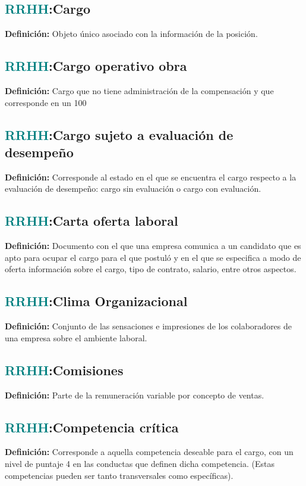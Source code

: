 \documentclass[12pt]{article}
\begin{document}
\subsection{\textcolor{teal}{RRHH}:{Cargo}}
\textbf{Definición:} Objeto único asociado con la información de la posición.
\subsection{\textcolor{teal}{RRHH}:{Cargo operativo obra}}
\textbf{Definición:} Cargo que no tiene administración de la compensación y que corresponde en un 100%
\subsection{\textcolor{teal}{RRHH}:{Cargo sujeto a evaluación de desempeño}}
\textbf{Definición:} Corresponde al estado en el que se encuentra el cargo respecto a la evaluación de desempeño: cargo sin evaluación o cargo con evaluación.
\subsection{\textcolor{teal}{RRHH}:{Carta oferta laboral}}
\textbf{Definición:} Documento con el que una empresa comunica a un candidato que es apto para ocupar el cargo para el que postuló y en el que se especifica a modo de oferta información sobre el cargo, tipo de contrato, salario, entre otros aspectos.
\subsection{\textcolor{teal}{RRHH}:{Clima Organizacional}}
\textbf{Definición:} Conjunto de las sensaciones e impresiones de los colaboradores de una empresa sobre el ambiente laboral.
\subsection{\textcolor{teal}{RRHH}:{Comisiones}}
\textbf{Definición:} Parte de la remuneración variable por concepto de ventas.
\subsection{\textcolor{teal}{RRHH}:{Competencia crítica}}
\textbf{Definición:} Corresponde a aquella competencia deseable para el cargo, con un nivel de puntaje 4 en las conductas que definen dicha competencia. (Estas competencias pueden ser tanto transversales como específicas).
\end{document}
